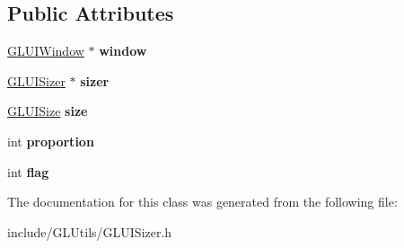 \subsection*{Public Attributes}
\begin{DoxyCompactItemize}
\item 
\hypertarget{classCartWheel_1_1GL_1_1GLUISizedWindow_a50b433689700e5231960d3ca8e7bd405}{
\hyperlink{classCartWheel_1_1GL_1_1GLUIWindow}{GLUIWindow} $\ast$ {\bfseries window}}
\label{classCartWheel_1_1GL_1_1GLUISizedWindow_a50b433689700e5231960d3ca8e7bd405}

\item 
\hypertarget{classCartWheel_1_1GL_1_1GLUISizedWindow_aade9bcaf1a8f627a79d9e6b78d715ecf}{
\hyperlink{classCartWheel_1_1GL_1_1GLUISizer}{GLUISizer} $\ast$ {\bfseries sizer}}
\label{classCartWheel_1_1GL_1_1GLUISizedWindow_aade9bcaf1a8f627a79d9e6b78d715ecf}

\item 
\hypertarget{classCartWheel_1_1GL_1_1GLUISizedWindow_a4efc4084279dd01088c160b3d12c022e}{
\hyperlink{classCartWheel_1_1GL_1_1GLUISize}{GLUISize} {\bfseries size}}
\label{classCartWheel_1_1GL_1_1GLUISizedWindow_a4efc4084279dd01088c160b3d12c022e}

\item 
\hypertarget{classCartWheel_1_1GL_1_1GLUISizedWindow_a2d18037530e7088da2713d06ff20568b}{
int {\bfseries proportion}}
\label{classCartWheel_1_1GL_1_1GLUISizedWindow_a2d18037530e7088da2713d06ff20568b}

\item 
\hypertarget{classCartWheel_1_1GL_1_1GLUISizedWindow_aa53e76e044708cbd4fdc349e2fe7c4bc}{
int {\bfseries flag}}
\label{classCartWheel_1_1GL_1_1GLUISizedWindow_aa53e76e044708cbd4fdc349e2fe7c4bc}

\end{DoxyCompactItemize}


The documentation for this class was generated from the following file:\begin{DoxyCompactItemize}
\item 
include/GLUtils/GLUISizer.h\end{DoxyCompactItemize}
